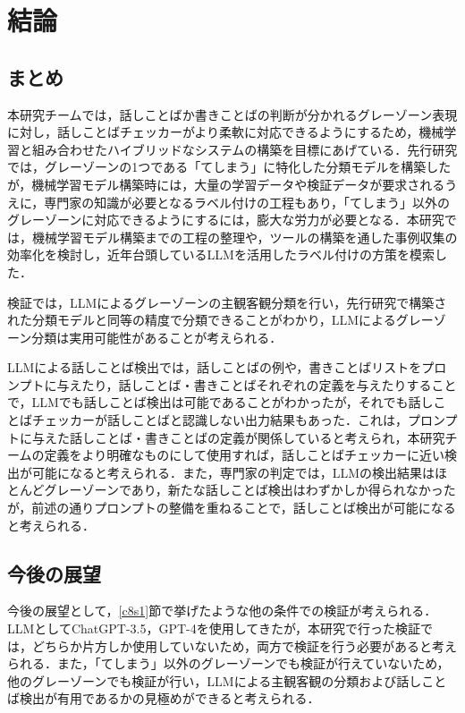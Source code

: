 \chapter{結論 \label{c9}}

\section{まとめ \label{c9s1}}
本研究チームでは，話しことばか書きことばの判断が分かれるグレーゾーン表現に対し，話しことばチェッカーがより柔軟に対応できるようにするため，機械学習と組み合わせたハイブリッドなシステムの構築を目標にあげている．先行研究では，グレーゾーンの1つである「てしまう」に特化した分類モデルを構築したが，機械学習モデル構築時には，大量の学習データや検証データが要求されるうえに，専門家の知識が必要となるラベル付けの工程もあり，「てしまう」以外のグレーゾーンに対応できるようにするには，膨大な労力が必要となる．本研究では，機械学習モデル構築までの工程の整理や，ツールの構築を通した事例収集の効率化を検討し，近年台頭しているLLMを活用したラベル付けの方策を模索した．

検証では，LLMによるグレーゾーンの主観客観分類を行い，先行研究で構築された分類モデルと同等の精度で分類できることがわかり，LLMによるグレーゾーン分類は実用可能性があることが考えられる．

LLMによる話しことば検出では，話しことばの例や，書きことばリストをプロンプトに与えたり，話しことば・書きことばそれぞれの定義を与えたりすることで，LLMでも話しことば検出は可能であることがわかったが，それでも話しことばチェッカーが話しことばと認識しない出力結果もあった．これは，プロンプトに与えた話しことば・書きことばの定義が関係していると考えられ，本研究チームの定義をより明確なものにして使用すれば，話しことばチェッカーに近い検出が可能になると考えられる．また，専門家の判定では，LLMの検出結果はほとんどグレーゾーンであり，新たな話しことば検出はわずかしか得られなかったが，前述の通りプロンプトの整備を重ねることで，話しことば検出が可能になると考えられる．

\section{今後の展望 \label{c9s2}}
今後の展望として，\ref{c8s1}節で挙げたような他の条件での検証が考えられる．LLMとしてChatGPT-3.5，GPT-4を使用してきたが，本研究で行った検証では，どちらか片方しか使用していないため，両方で検証を行う必要があると考えられる．また，「てしまう」以外のグレーゾーンでも検証が行えていないため，他のグレーゾーンでも検証が行い，LLMによる主観客観の分類および話しことば検出が有用であるかの見極めができると考えられる．

